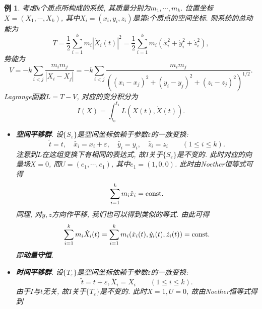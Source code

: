 \documentclass[12pt,a4paper]{article}
\newtheorem{example}[theorem]{例}
\begin{document}
\begin{example}
    考虑$k$个质点所构成的系统, 其质量分别为$m_1, \cdots, m_k$.
    位置坐标$X = (X_1, \cdots, X_k)$, 其中$X_i = (x_i, y_i, z_i)$是第$i$个质点的空间坐标.
    则系统的总动能为
    \begin{equation*}
        T = \frac{1}{2}\sum_{i = 1}^km_i|\dot X_i(t)|^2 = \frac{1}{2}\sum_{i = 1}^km_i(\dot x_i^2 + \dot y_i^2 + \dot z_i^2),
    \end{equation*}
    势能为 
    \begin{equation*}
        V = -k\sum_{i < j}\frac{m_im_j}{|X_i - X_j|} = -k\sum_{i < j}\frac{m_im_j}{((x_i - x_j)^2 + (y_i - y_j)^2 + (z_i - z_j)^2)^{1/2}}.
    \end{equation*}
    Lagrange函数$L = T - V$, 对应的变分积分为 
    \begin{equation*}
        I(X) = \int_{t_0}^{t_1}L(X(t), \dot X(t)).
    \end{equation*}
    \begin{itemize}
        \item \textbf{空间平移群}. 设$\{S_{\varepsilon}\}$是空间坐标依赖于参数$\varepsilon$的一族变换:
        \begin{equation*}
            \widetilde{t} = t, \quad \widetilde{x_i} = x_i + \varepsilon, \quad\widetilde{y_i} = y_i, \quad\widetilde{z_i} = z_i \qquad (1 \leq i \leq k).
        \end{equation*}
        注意到$L$在这组变换下有相同的表达式, 故$I$关于$\{S_{\varepsilon}\}$是不变的.
        此时对应的向量场$X = 0$, 而$ U = (e_1, \cdots, e_1)$, 其中$e_1 = (1, 0, 0)$. 
        此时由Noether恒等式可得
        \begin{equation*}
            \sum_{i = 1}^km_i\dot x_i = {\rm const}.
        \end{equation*}
        同理, 对$y, z$方向作平移, 我们也可以得到类似的等式. 由此可得 
        \begin{equation*}
            \sum_{i = 1}^km_i\dot X_i(t) = \sum_{i = 1}^km_i(\dot x_i(t), \dot y_i(t), \dot z_i(t)) = {\rm const}.
        \end{equation*}
        即\textbf{动量守恒}.
        \item \textbf{时间平移群}. 设$\{T_{\varepsilon}\}$是空间坐标依赖于参数$\varepsilon$的一族变换:
        \begin{equation*}
            \widetilde{t} = t + \varepsilon, \widetilde{X_i} = X_i \qquad (1 \leq i \leq k).
        \end{equation*}
        由于$I$与$t$无关, 故$I$关于$\{T_{\varepsilon}\}$是不变的. 此时$X = 1, U = 0$, 故由Noether恒等式得到

\end{itemize}
\end{example}
\end{document}
